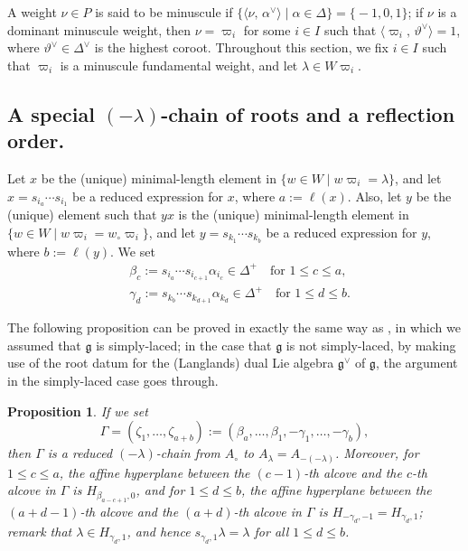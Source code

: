 \documentclass[11pt,a4paper,reqno,dvipdfmx]{amsart}
\numberwithin{equation}{section}
\newcommand{\Fg}{\mathfrak{g}}
\newcommand{\vpi}{\varpi}
\newcommand{\lng}{w_{\circ}}
\newcommand{\pair}[2]{\langle #1,\,#2 \rangle}
\theoremstyle{plain}
\newtheorem{prop}[lem]{Proposition}
\theoremstyle{definition}
\theoremstyle{remark}
\begin{document}
A weight $\nu \in P$ is said to be minuscule if 
$\bigl\{ \pair{\nu}{\alpha^{\vee}} \mid \alpha \in \Delta \bigr\} = \bigl\{ -1, 0,1 \bigr\}$; 
if $\nu$ is a dominant minuscule weight, then $\nu = \vpi_{i}$ for some $i \in I$ 
such that $\pair{\varpi_i}{\vartheta^{\vee}} = 1$, 
where $\vartheta^{\vee} \in \Delta^{\vee}$ is the highest coroot. 
Throughout this section, we fix $i \in I$ such that $\vpi_{i}$ is a minuscule fundamental weight, 
and let $\lambda \in W\vpi_{i}$. 

%
\subsection{A special $(-\lambda)$-chain of roots and a reflection order.}
\label{subsec:chain}

Let $x$ be the (unique) minimal-length element in 
$\bigl\{ w \in W \mid w \vpi_{i} = \lambda \bigr\}$, 
and let $x = s_{i_{a}} \cdots s_{i_{1}}$ be a reduced expression for $x$, 
where $a:=\ell(x)$. 
%
Also, let $y$ be the (unique) element such that 
$yx$ is the (unique) minimal-length element in 
$\bigl\{ w \in W \mid w \vpi_{i} = \lng \vpi_{i} \bigr\}$, 
and let $y = s_{k_{1}} \cdots s_{k_{b}}$ be a reduced expression for $y$, 
where $b:=\ell(y)$. We set 
%
\begin{align}
& \beta_{c}:=s_{i_{a}} \cdots s_{i_{c+1}}\alpha_{i_{c}} \in \Delta^{+} \quad 
  \text{for $1 \le c \le a$}, \label{eq:beta} \\
& \gamma_{d}:=s_{k_{b}} \cdots s_{k_{d+1}}\alpha_{k_{d}} \in \Delta^{+} \quad 
  \text{for $1 \le d \le b$}. \label{eq:gamma}
\end{align}

The following proposition can be proved in exactly 
the same way as \cite[Lemma 4.1]{LNOS}, in which we assumed that 
$\Fg$ is simply-laced; in the case that $\Fg$ is not simply-laced, 
by making use of the root datum for the (Langlands) dual Lie algebra $\Fg^{\vee}$ of $\Fg$, 
the argument in the simply-laced case goes through.
%
%
\begin{prop} \label{prop:LNOS41}
If we set 
%
\begin{equation} \label{eq:GammaJ}
\Gamma=(\zeta_{1},\dots,\zeta_{a+b}):=
(\beta_{a},\dots,\beta_{1},-\gamma_{1},\dots,-\gamma_{b}),
\end{equation}
%
then $\Gamma$ is a reduced $(-\lambda)$-chain from $A_{\circ}$ to $A_{\lambda} = A_{-(-\lambda)}$. 
Moreover, for $1 \le c \le a$, the affine hyperplane between the $(c-1)$-th alcove and 
the $c$-th alcove in $\Gamma$ is $H_{\beta_{a-c+1},0}$, and 
for $1 \le d \le b$, the affine hyperplane between the $(a+d-1)$-th alcove and 
the $(a+d)$-th alcove in $\Gamma$ is $H_{-\gamma_{d},-1} = H_{\gamma_{d},1}${\rm ;}
remark that $\lambda \in H_{\gamma_{d},1}$, and 
hence $s_{\gamma_{d},1}\lambda = \lambda$ for all $1 \le d \le b$. 
\end{prop}
\end{document}
